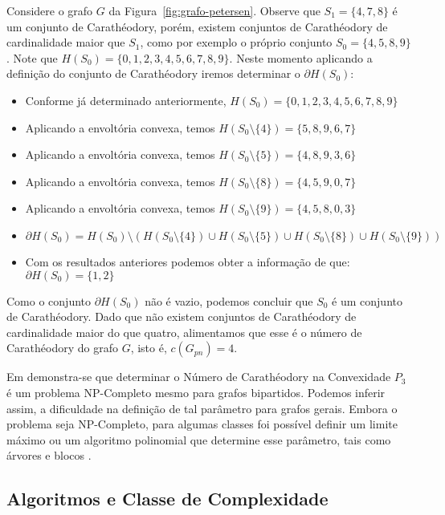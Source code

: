 Considere o grafo $G$ da Figura~\ref{fig:grafo-petersen}. Observe que $S_1=\{4,7,8\}$ é um conjunto de 
Carathéodory, porém, existem conjuntos de Carathéodory de cardinalidade maior que $S_1$, como por exemplo o
próprio conjunto $S_0 = \{4,5,8,9\}$. Note que $H(S_0)=\{0, 1, 2, 3, 4, 5, 6, 7, 8, 9\}$.
Neste momento aplicando a definição do conjunto de Carathéodory iremos determinar o $\partial H(S_0)$:
\begin{itemize}
    \item{Conforme já determinado anteriormente, $H(S_0)=\{0, 1, 2, 3, 4, 5, 6, 7, 8, 9\}$}
    \item{Aplicando a envoltória convexa, temos $H(S_0 \setminus \{4\})=\{5,8,9,6,7\}$}
    \item{Aplicando a envoltória convexa, temos $H(S_0 \setminus \{5\})=\{4,8,9,3,6\}$}
    \item{Aplicando a envoltória convexa, temos $H(S_0 \setminus \{8\})=\{4,5,9,0,7\}$}
    \item{Aplicando a envoltória convexa, temos $H(S_0 \setminus \{9\})=\{4,5,8,0,3\}$}
    \item{$\partial H(S_0)=H(S_0) \setminus (H(S_0 \setminus \{4\}) \cup H(S_0 \setminus \{5\}) \cup H(S_0 \setminus \{8\}) \cup H(S_0 \setminus \{9\}))$}
    \item{Com os resultados anteriores podemos obter a informação de que: $\partial H(S_0)=\{1,2\}$}
\end{itemize}

Como o conjunto $\partial H(S_0)$ não é vazio, 
podemos concluir que $S_0$ é um conjunto de Carathéodory.
Dado que não existem conjuntos de Carathéodory 
de cardinalidade maior do que quatro,
alimentamos que esse é o número de Carathéodory do grafo $G$,
isto é, $c(G_{pn})=4$.

Em \cite{Barbosa2012} demonstra-se que determinar o Número de Carathéodory na Convexidade $P_3$
é um problema NP-Completo mesmo para grafos bipartidos. 
Podemos inferir assim, a dificuldade na definição de tal parâmetro para grafos gerais. 
Embora o problema seja NP-Completo, 
para algumas classes foi possível definir um limite máximo 
ou um algoritmo polinomial que determine esse parâmetro,
tais como árvores e blocos \cite{Coelho2012}. 


\subsection{Algoritmos e Classe de Complexidade}

